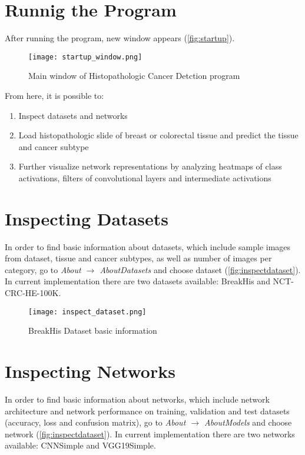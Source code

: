 \section{Runnig the Program}

After running the program, new window appears (\textcolor{red}{\autoref{fig:startup}}).

\begin{figure}[h]
	\centering
	\texttt{[image: startup\_window.png]}
	\caption{Main window of Histopathologic Cancer Detction program}
	\label{fig:startup}
\end{figure}

From here, it is possible to:
\begin{enumerate}
	\itemsep 0em
	\item Inspect datasets and networks
	\item Load histopathologic slide of breast or colorectal tissue and predict the tissue and cancer subtype
	\item Further visualize network representations by analyzing heatmaps of class activations, filters of convolutional layers and intermediate activations
\end{enumerate}

\section{Inspecting Datasets}

In order to find basic information about datasets, which include sample images from dataset, tissue and cancer subtypes, as well as number of images per category, go to \emph{About $\rightarrow$ About\;Datasets} and choose dataset (\textcolor{red}{\autoref{fig:inspectdataset}}). In current implementation there are two datasets available: BreakHis and NCT-CRC-HE-100K.
\clearpage

\begin{figure}[h]
	\centering
	\texttt{[image: inspect\_dataset.png]}
	\caption{BreakHis Dataset basic information}
	\label{fig:inspectdataset}
\end{figure}

\section{Inspecting Networks}

In order to find basic information about networks, which include network architecture and network performance on training, validation and test datasets (accuracy, loss and confusion matrix), go to \emph{About $\rightarrow$ About\;Models} and choose network (\textcolor{red}{\autoref{fig:inspectdataset}}). In current implementation there are two networks available: CNNSimple and VGG19Simple.


